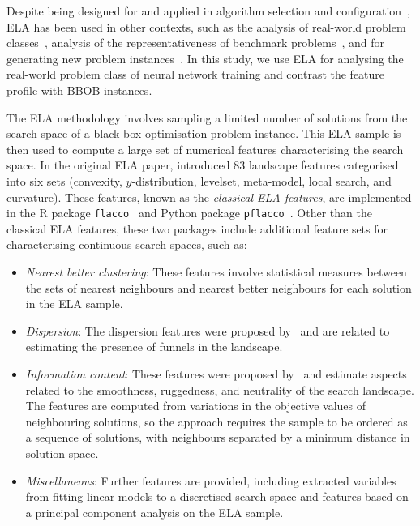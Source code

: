 \documentclass[acmsmall,screen,review,anonymous]{acmart}
\begin{document}
Despite being designed for and applied in algorithm selection and configuration~\cite{Bischl2012,Kerschke2019_AAS}, ELA has been used in other contexts, such as the analysis of real-world problem classes~\cite{Long2022,Schneider2022}, analysis of the representativeness of benchmark problems~\cite{lang2021}, and for generating new problem instances~\cite{long2023challenges,Munoz2020}. In this study, we use ELA for analysing the real-world problem class of neural network training and contrast the feature profile with BBOB instances. 

The ELA methodology involves sampling a limited number of solutions from the search space of a black-box optimisation problem instance. This ELA sample is then used to compute a large set of numerical features characterising the search space. In the original ELA paper, \citet{Mersmann2011} introduced 83 landscape features categorised into six sets (convexity, $y$-distribution, levelset, meta-model, local search, and curvature). These features, known as the {\it classical ELA features}, are implemented in the R package \texttt{flacco}~\cite{Kerschke2019} and Python package \texttt{pflacco}~\cite{Prager2024}. Other than the classical ELA features, these two packages include additional feature sets for characterising continuous search spaces, such as:
\begin{itemize}
    \item {\it Nearest better clustering}: These features involve statistical measures between the sets of nearest neighbours and nearest better neighbours for each solution in the ELA sample.
    
    \item {\it Dispersion}: The dispersion features were proposed by~\citet{Lunacek2006} and are related to estimating the presence of funnels in the landscape.
    
    \item {\it Information content}: These features were proposed by~\citet{Munoz2015} and estimate aspects related to the smoothness, ruggedness, and neutrality of the search landscape. The features are computed from variations in the objective values of neighbouring solutions, so the approach requires the sample to be ordered as a sequence of solutions, with neighbours separated by a minimum distance in solution space.

    \item {\it Miscellaneous}: Further features are provided, including extracted variables from fitting linear models to a discretised search space and features based on a principal component analysis on the ELA sample.
\end{itemize}
\end{document}
